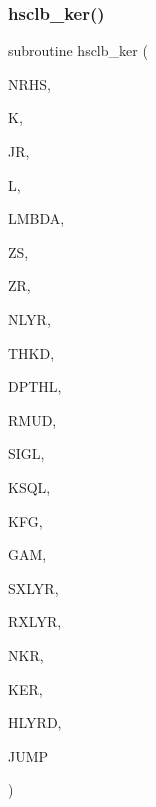 \subsubsection{\texorpdfstring{hsclb\+\_\+ker()}{hsclb\_ker()}}
{\footnotesize\ttfamily subroutine hsclb\+\_\+ker (\begin{DoxyParamCaption}\item[{integer}]{N\+R\+HS,  }\item[{integer}]{K,  }\item[{integer}]{JR,  }\item[{integer}]{L,  }\item[{real(kind=ql)}]{L\+M\+B\+DA,  }\item[{real(kind=ql)}]{ZS,  }\item[{real(kind=ql)}]{ZR,  }\item[{integer}]{N\+L\+YR,  }\item[{real(kind=ql), dimension (nlyr)}]{T\+H\+KD,  }\item[{real(kind=ql), dimension (nlyr)}]{D\+P\+T\+HL,  }\item[{real(kind=ql), dimension(0\+:nlyr)}]{R\+M\+UD,  }\item[{complex(kind=ql), dimension (nlyr)}]{S\+I\+GL,  }\item[{complex(kind=ql), dimension (nlyr)}]{K\+S\+QL,  }\item[{integer}]{K\+FG,  }\item[{integer}]{G\+AM,  }\item[{integer}]{S\+X\+L\+YR,  }\item[{integer}]{R\+X\+L\+YR,  }\item[{integer}]{N\+KR,  }\item[{complex(kind=ql), dimension(jnlo-\/nrhs\+:jnhi,nkr)}]{K\+ER,  }\item[{complex(kind=ql), dimension(nrhs,3)}]{H\+L\+Y\+RD,  }\item[{logical}]{J\+U\+MP }\end{DoxyParamCaption})}

